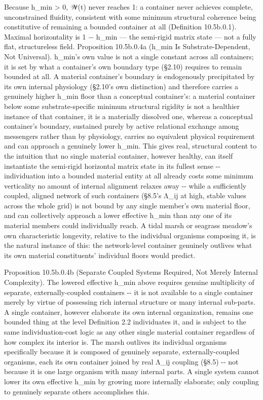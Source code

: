 \documentclass[
]{article}
\begin{document}
Because h\_min \textgreater{} 0, 𝒲(t) never reaches 1: a container never
achieves complete, unconstrained fluidity, consistent with some minimum
structural coherence being constitutive of remaining a bounded container
at all (Definition 10.5b.0.1). Maximal horizontality is 1 − h\_min ---
the semi-rigid matrix state --- not a fully flat, structureless field.
Proposition 10.5b.0.4a (h\_min Is Substrate-Dependent, Not Universal).
h\_min's own value is not a single constant across all containers; it is
set by what a container's own boundary type (§2.10) requires to remain
bounded at all. A material container's boundary is endogenously
precipitated by its own internal physiology (§2.10's own distinction)
and therefore carries a genuinely higher h\_min floor than a conceptual
container's: a material container below some substrate-specific minimum
structural rigidity is not a healthier instance of that container, it is
a materially dissolved one, whereas a conceptual container's boundary,
sustained purely by active relational exchange among messengers rather
than by physiology, carries no equivalent physical requirement and can
approach a genuinely lower h\_min. This gives real, structural content
to the intuition that no single material container, however healthy, can
itself instantiate the semi-rigid horizontal matrix state in its fullest
sense -\/- individuation into a bounded material entity at all already
costs some minimum verticality no amount of internal alignment relaxes
away -\/- while a sufficiently coupled, aligned network of such
containers (§8.5's Λ\_ij at high, stable values across the whole grid)
is not bound by any single member's own material floor, and can
collectively approach a lower effective h\_min than any one of its
material members could individually reach. A tidal marsh or seagrass
meadow's own characteristic longevity, relative to the individual
organisms composing it, is the natural instance of this: the
network-level container genuinely outlives what its own material
constituents' individual floors would predict.

Proposition 10.5b.0.4b (Separate Coupled Systems Required, Not Merely
Internal Complexity). The lowered effective h\_min above requires
genuine multiplicity of separate, externally-coupled containers -\/- it
is not available to a single container merely by virtue of possessing
rich internal structure or many internal sub-parts. A single container,
however elaborate its own internal organization, remains one bounded
thing at the level Definition 2.2 individuates it, and is subject to the
same individuation-cost logic as any other single material container
regardless of how complex its interior is. The marsh outlives its
individual organisms specifically because it is composed of genuinely
separate, externally-coupled organisms, each its own container joined by
real Λ\_ij coupling (§8.5) -\/- not because it is one large organism
with many internal parts. A single system cannot lower its own effective
h\_min by growing more internally elaborate; only coupling to genuinely
separate others accomplishes this.
\end{document}
